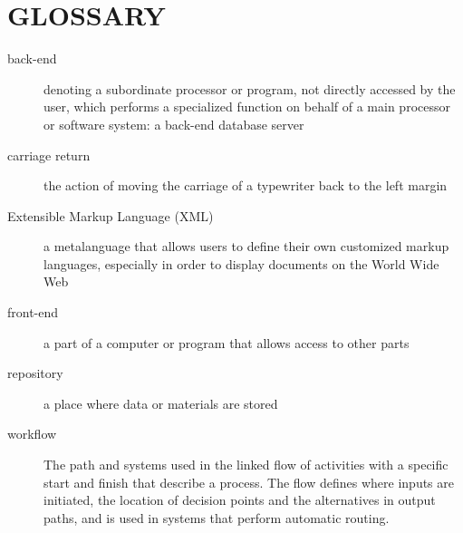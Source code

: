 \section*{GLOSSARY} %
\label{sec:glossary}
	\begin{description}
		
		\item[back-end]
denoting a subordinate processor or program, not directly accessed by the user, which performs a specialized function on behalf of a main processor or software system: a back-end database server

		\item[carriage return]
the action of moving the carriage of a typewriter back to the left margin
		
		\item[Extensible Markup Language (XML)]
a metalanguage that allows users to define their own customized markup languages, especially in order to display documents on the World Wide Web

		\item[front-end]
a part of a computer or program that allows access to other parts
		
		\item[repository]
a place where data or materials are stored

		\item[workflow]
The path and systems used in the linked flow of activities with a specific start and finish that describe a process. The flow defines where inputs are initiated, the location of decision points and the alternatives in output paths, and is used in systems that perform automatic routing.
	\end{description}
